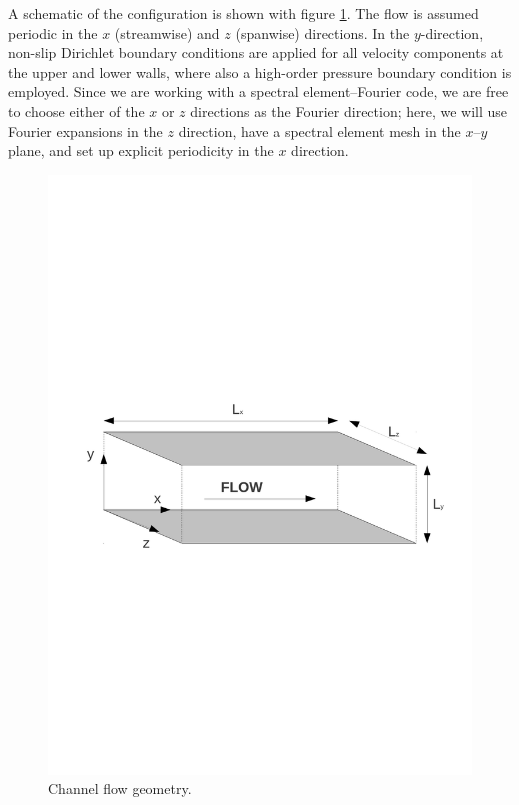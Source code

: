 \documentclass[11pt]{report}
\begin{document}
A schematic of the configuration is shown with figure
\ref{pic:configuration}. The flow is assumed periodic in the $x$
(streamwise) and $z$ (spanwise) directions.  In the $y$-direction,
non-slip Dirichlet boundary conditions are applied for all velocity
components at the upper and lower walls, where also a high-order
pressure boundary condition \citep[of computed Neumann type,
  see][]{kio91} is employed. Since we are working with a spectral
element--Fourier code, we are free to choose either of the $x$ or $z$
directions as the Fourier direction; here, we will use Fourier
expansions in the $z$ direction, have a spectral element mesh in the
$x$--$y$ plane, and set up explicit periodicity in the $x$ direction.
\begin{figure}[h]
\centering
\includegraphics[width=0.8\linewidth]{dns_config}
\caption{Channel flow geometry.}
\label{pic:configuration}
\end{figure}

\end{document}
